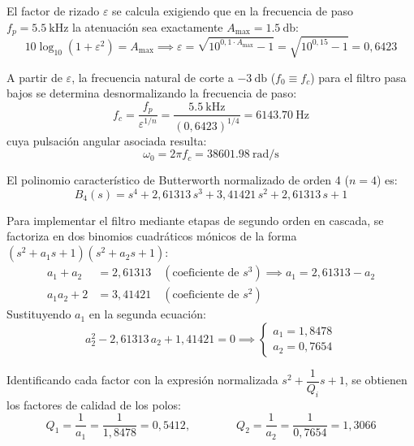 El factor de rizado $\varepsilon$ se calcula exigiendo que en la frecuencia de paso $f_p = \SI{5.5}{\kilo\hertz}$ la
atenuación sea exactamente $A_{\max} = \SI{1.5}{\decibel}$:
\begin{equation}
  10 \log_{10} \left( 1 + \varepsilon^2 \right) = A_{\max} \implies
  \varepsilon = \sqrt{10^{0{,}1 \cdot A_{\max}} - 1} = \sqrt{10^{0{,}15} - 1} = 0{,}6423
  \label{eq:pb-epsilon}
\end{equation}

A partir de $\varepsilon$, la frecuencia natural de corte a $\SI{-3}{\decibel}$ ($f_0 \equiv f_c$) para el filtro pasa
bajos se determina desnormalizando la frecuencia de paso:
\begin{equation}
  f_c = \frac{f_p}{\varepsilon^{1/n}} = \frac{\SI{5.5}{\kilo\hertz}}{\left( 0{,}6423 \right)^{1/4}}
  = \SI{6143.70}{\hertz}
  \label{eq:pb-fc}
\end{equation}
cuya pulsación angular asociada resulta:
\begin{equation}
  \omega_0 = 2\pi f_c = \SI{38601.98}{\radian/\second}
  \label{eq:pb-omega0}
\end{equation}

El polinomio característico de Butterworth normalizado de orden 4 ($n=4$) es:
\begin{equation}
  B_4(s) = s^4 + 2{,}61313\,s^3 + 3{,}41421\,s^2 + 2{,}61313\,s + 1
\end{equation}

Para implementar el filtro mediante etapas de segundo orden en cascada, se factoriza en dos binomios cuadráticos
mónicos de la forma $\left( s^2 + a_1 s + 1 \right) \left( s^2 + a_2 s + 1 \right)$:
\begin{align*}
  a_1 + a_2 &= 2{,}61313 \quad (\text{coeficiente de } s^3) \implies a_1 = 2{,}61313 - a_2 \\
  a_1 a_2 + 2 &= 3{,}41421 \quad (\text{coeficiente de } s^2)
\end{align*}
Sustituyendo $a_1$ en la segunda ecuación:
\begin{equation}
  a_2^2 - 2{,}61313\,a_2 + 1{,}41421 = 0 \implies \begin{cases} a_1 = 1{,}8478 \\ a_2 = 0{,}7654 \end{cases}
\end{equation}

Identificando cada factor con la expresión normalizada $s^2 + \dfrac{1}{Q_i} s + 1$, se obtienen los factores de
calidad de los polos:
\begin{equation}
  Q_1 = \frac{1}{a_1} = \frac{1}{1{,}8478} = 0{,}5412, \qquad\qquad Q_2 = \frac{1}{a_2} = \frac{1}{0{,}7654} = 1{,}3066
  \label{eq:pb-factores-q}
\end{equation}

